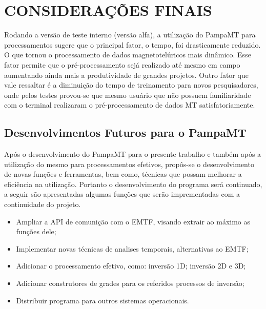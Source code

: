 \chapter{CONSIDERAÇÕES FINAIS}
    
    Rodando a versão de teste interno (versão alfa), a utilização do PampaMT para processamentos sugere que o principal fator, o tempo, foi drasticamente reduzido. O que tornou o processamento de dados magnetotelúricos mais dinâmico. Esse fator permite que o pré-processamento sejá realizado até mesmo em campo aumentando ainda mais a produtividade de grandes projetos. Outro fator que vale ressaltar é a diminuição do tempo de treinamento para novos pesquisadores, onde pelos testes provou-se que mesmo usuário que não possuem familiaridade com o terminal realizaram o pré-processamento de dados MT  satisfatoriamente.     
    
    \section{Desenvolvimentos Futuros para o PampaMT}
        
        Após o desenvolvimento do PampaMT para o presente trabalho e também após a utilização do mesmo para processamentos efetivos, propôs-se o desenvolvimento de novas funções e ferramentas, bem como, técnicas que possam melhorar a eficiência na utilização. Portanto o desenvolvimento do programa será continuado, a seguir são apresentadas algumas funções que serão imprementadas com a continuidade do projeto.
        
        \begin{itemize}
         \item Ampliar a API de comunição com o EMTF, visando extrair ao máximo as funções dele;
         \item Implementar novas técnicas de analises temporais, alternativas ao EMTF;
         \item Adicionar o processamento efetivo, como: inversão 1D; inversão 2D e 3D;
         \item Adicionar construtores de grades para os referidos processos de inversão;
         \item Distribuir programa para outros sistemas operacionais.
        \end{itemize}
